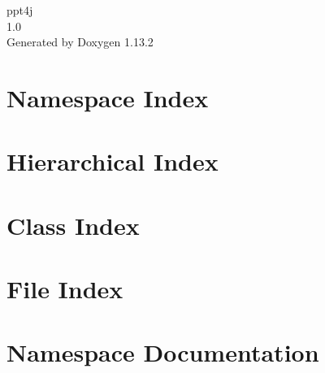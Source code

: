 \documentclass[twoside]{book}
\newcommand{\+}{\discretionary{\mbox{\scriptsize$\hookleftarrow$}}{}{}}
\newcommand{\clearemptydoublepage}{%
    \newpage{\pagestyle{empty}\cleardoublepage}%
  }
\begin{document}
  \raggedbottom
    \hypersetup{pageanchor=false,
                bookmarksnumbered=true,
                pdfencoding=unicode
               }
  \begin{titlepage}
  \vspace*{7cm}
  \begin{center}%
  {\Large ppt4j}\\
  [1ex]\large 1.\+0 \\
  \vspace*{1cm}
  {\large Generated by Doxygen 1.13.2}\\
  \end{center}
  \end{titlepage}
  \clearemptydoublepage
  \tableofcontents
  \clearemptydoublepage
  \hypersetup{pageanchor=true}

\chapter{Namespace Index}

\chapter{Hierarchical Index}

\chapter{Class Index}

\chapter{File Index}

\chapter{Namespace Documentation}














\end{document}
